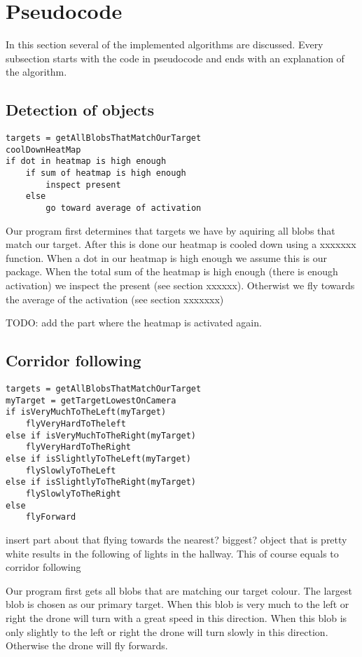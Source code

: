 \documentclass[a4paper,10pt]{article}
\begin{document}


\section{Pseudocode}
In this section several of the implemented algorithms are discussed. Every subsection starts with the code in pseudocode and ends with an explanation of the algorithm. 
\subsection{Detection of objects}
\begin{verbatim}
targets = getAllBlobsThatMatchOurTarget
coolDownHeatMap
if dot in heatmap is high enough
	if sum of heatmap is high enough
		inspect present
	else
		go toward average of activation

\end{verbatim}
Our program first determines that targets we have by aquiring all blobs that match our target. 
After this is done our heatmap is cooled down using a xxxxxxx function. 
When a dot in our heatmap is high enough we assume this is our package. 
When the total sum of the heatmap is high enough (there is enough activation) we inspect the present (see section xxxxxx). 
Otherwist we fly towards the average of the activation (see section xxxxxxx)


TODO: add the part where the heatmap is activated again. 
\subsection{Corridor following} 
\begin{verbatim}
targets = getAllBlobsThatMatchOurTarget
myTarget = getTargetLowestOnCamera
if isVeryMuchToTheLeft(myTarget)
	flyVeryHardToTheleft
else if isVeryMuchToTheRight(myTarget)
	flyVeryHardToTheRight
else if isSlightlyToTheLeft(myTarget)
	flySlowlyToTheLeft
else if isSlightlyToTheRight(myTarget)
	flySlowlyToTheRight
else
	flyForward

\end{verbatim}

insert part about that flying towards the nearest? biggest? object that is pretty white results in the following of lights in the hallway. This of course equals to corridor following

Our program first gets all blobs that are matching our target colour. 
The largest blob is chosen as our primary target. 
When this blob is very much to the left or right the drone will turn with a great speed in this direction. 
When this blob is only slightly to the left or right the drone will turn slowly in this direction. 
Otherwise the drone will fly forwards. 
\end{document}
